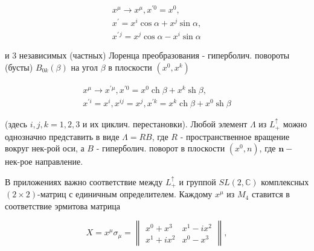 \documentclass[10pt]{article}
\begin{document}
\[

\begin{gathered}

x^{\mu} \rightarrow x^{\mu}, x^{\prime 0}=x^{0}, \\

x^{\prime}=x^{i} \cos \alpha+x^{j} \sin \alpha, \\

x^{\prime}{ }^{j}=x^{j} \cos \alpha-x^{i} \sin \alpha

\end{gathered}

\]



и 3 независимых (частных) Лоренца преобразования - гиперболич. повороты (бусты) $B_{0 k}(\beta)$ на угол $\beta$ в плоскости $\left(x^{0}, x^{k}\right)$



\[

\begin{gathered}

x^{\mu} \rightarrow x^{\prime \mu}, x^{\prime 0}=x^{0} \operatorname{ch} \beta+x^{k} \operatorname{sh} \beta, \\

x^{\prime i}=x^{i}, x^{i j}=x^{j}, x^{\prime k}=x^{k} \operatorname{ch} \beta+x^{0} \operatorname{sh} \beta

\end{gathered}

\]



(здесь $i, j, k=1,2,3$ и их циклич. перестановки). Любой элемент $\Lambda$ из $L_{+}^{\uparrow}$ можно однозначно представить в виде $\Lambda=R B$, где $R$ - пространственное вращение вокруг нек-рой оси, а $B$ - гиперболич. поворот в плоскости $\left(x^{0}, n\right)$, где $\boldsymbol{n}-$ нек-рое направление.



В приложениях важно соответствие между $L_{+}^{\uparrow}$ и группой $S L(2, \mathbb{C})$ комплексных $(2 \times 2)$-матриц с единичным определителем. Каждому $x^{\mu}$ из $M_{4}$ ставится в соответствие эрмитова матрица



\[

X=x^{\mu} \sigma_{\mu}=\left\|\begin{array}{ll}

x^{0}+x^{3} & x^{1}-i x^{2} \\

x^{1}+i x^{2} & x^{0}-x^{3}

\end{array}\right\|,

\]
\end{document}
